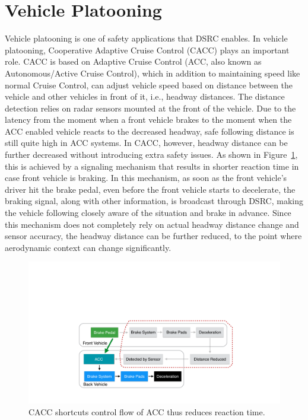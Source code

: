 \documentclass[12pt]{report}
\begin{document}
\section{Vehicle Platooning}
Vehicle platooning is one of safety applications that DSRC enables. In vehicle platooning, Cooperative Adaptive Cruise Control (CACC) plays an important role. CACC is based on Adaptive Cruise Control (ACC, also known as Autonomous/Active Cruise Control), which in addition to maintaining speed like normal Cruise Control, can adjust vehicle speed based on distance between the vehicle and other vehicles in front of it, i.e., headway distances. The distance detection relies on radar sensors mounted at the front of the vehicle. Due to the latency from the moment when a front vehicle brakes to the moment when the ACC enabled vehicle reacts to the decreased headway, safe following distance is still quite high in ACC systems. In CACC, however, headway distance can be further decreased without introducing extra safety issues. As shown in Figure~\ref{fig:brake}, this is achieved by a signaling mechanism that results in shorter reaction time in case front vehicle is braking. In this mechanism, as soon as the front vehicle's driver hit the brake pedal, even before the front vehicle starts to decelerate, the braking signal, along with other information, is broadcast through DSRC, making the vehicle following closely aware of the situation and brake in advance. Since this mechanism does not completely rely on actual headway distance change and sensor accuracy, the headway distance can be further reduced, to the point where aerodynamic context can change significantly.

\begin{figure}[htb]
  \begin{center}
    \includegraphics[width=.7\columnwidth]{figures/brake.pdf}
    \caption{\label{fig:brake}CACC shortcuts control flow of ACC thus reduces reaction time.}
  \end{center}
\end{figure}
\end{document}
